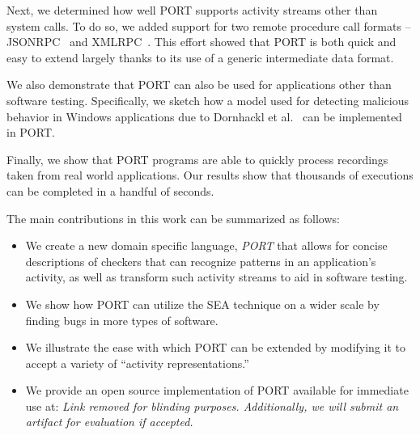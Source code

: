 Next, we
determined how well PORT
supports activity streams
other than system calls.
To do so, we 
added support for two remote procedure call formats --
JSONRPC~\cite{jsonspec} and XMLRPC~\cite{xmlspec}.
This effort
showed that PORT is both quick and easy to extend largely thanks to its
use of a generic intermediate data format.

We also demonstrate that PORT can also be used for applications other than software testing.
Specifically, we sketch how a model used for
detecting malicious behavior in Windows applications due to Dornhackl et al.~\cite{Dornhackl2014} can be implemented in PORT.

Finally, we show that PORT programs are able to quickly process recordings taken from real world applications.  Our results show that thousands of executions can be completed in a handful of seconds.


The main contributions in this work can be summarized as follows:

\begin{itemize}

\item We create a new domain specific language, {\em PORT}
  that allows for concise descriptions of checkers that can recognize patterns in
  an application's activity, as well as transform such activity streams to aid in software testing.

\item We show how PORT can utilize the SEA technique on a wider scale by finding bugs in more types of software.

\item We illustrate the ease with which PORT can be extended by modifying
  it to accept a variety of ``activity representations.''
  
\item We provide an open source implementation of PORT available for immediate use
at: \textit{Link removed for blinding purposes. Additionally, we will submit an artifact for evaluation if accepted.}

\end{itemize}


